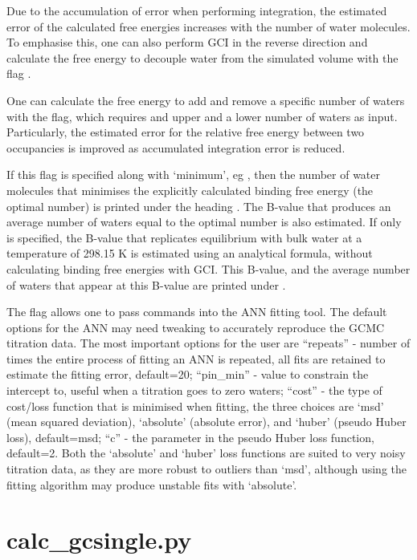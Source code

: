 \documentclass[letterpaper,10pt,english]{manual}
\begin{document}
Due to the accumulation of error when performing integration, the estimated error of the calculated free energies increases with the number of water molecules. To emphasise this, one can also perform GCI in the reverse direction and calculate the free energy to decouple water from the simulated volume with the flag .

One can calculate the free energy to add and remove a specific number of waters with the  flag, which requires and upper and a lower number of waters as input. Particularly, the estimated error for the relative free energy between two occupancies is improved as accumulated integration error is reduced.

If this flag is specified along with `minimum', eg , then the number of water molecules that minimises the explicitly calculated binding free energy (the optimal number) is printed under the heading . The B-value that produces an average number of waters equal to the optimal number is also estimated. If only  is specified, the B-value that replicates equilibrium with bulk water at a temperature of 298.15 K is estimated using an analytical formula, without calculating binding free energies with GCI. This B-value, and the average number of waters that appear at this B-value are printed under .

The flag  allows one to pass commands into the ANN fitting tool. The default options for the ANN may need tweaking to accurately reproduce the GCMC titration data. The most important options for the user are “repeats'' - number of times the entire process of fitting an ANN is repeated, all fits are retained to estimate the fitting error, default=20; “pin\_min” - value to constrain the intercept to, useful when a titration goes to zero waters; “cost” - the type of cost/loss function that is minimised when fitting, the three choices are `msd' (mean squared deviation), `absolute' (absolute error), and `huber' (pseudo Huber loss), default=msd; “c” - the parameter in the pseudo Huber loss function, default=2. Both the `absolute' and `huber' loss functions are suited to very noisy titration data, as they are more robust to outliers than `msd', although using  the fitting algorithm may produce unstable fits with `absolute'.


\section{calc\_gcsingle.py}
\end{document}
